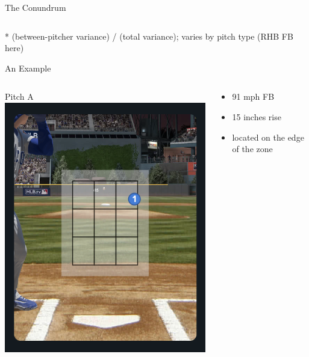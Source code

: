 \documentclass{beamer}
\begin{document}
\begin{frame}{The Conundrum}
\begin{columns}
\begin{column}{0.5\textwidth}
      \end{column}
    \end{columns}
    \scriptsize \color{ricegray}
    \vfill
    * (between-pitcher variance) / (total variance); varies by pitch type (RHB FB here)
  \end{frame}

  \begin{frame}{An Example}
    \begin{columns}
      \begin{column}{0.2\textwidth}
        \centering
        Pitch A\\
        \includegraphics[width = \textwidth]{images/pitch_on_edge}
      \end{column}
      \begin{column}{0.8\textwidth}
        \begin{itemize}
          \item 91 mph FB
          \item 15 inches rise
          \item located on the edge of the zone

\end{itemize}
\end{column}
\end{columns}
\end{frame}
\end{document}

